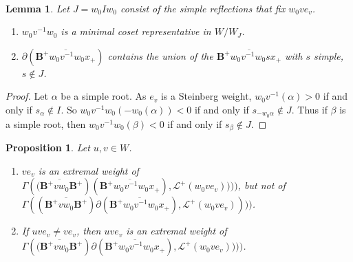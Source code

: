 \documentclass[sn-mathphys-num]{sn-jnl}%
\newcommand{\Ll}{\mathcal L}
\newcommand{\fb}{\mathbf B}
\newtheorem{lemma}[theorem]{Lemma}
\newtheorem{proposition}[theorem]{Proposition}
\theoremstyle{definition}
\begin{document}
\

\begin{lemma}
\label{lem:s to boundary}Let $J=w_0Iw_0$ consist of the simple reflections that fix $w_0ve_v$. 
\begin{enumerate}
\item $w_0v^{-1}w_0$  is a minimal coset representative in $W/W_J$.
\item $\partial(\overline{{\fb}^+w_0v^{-1}w_0x_+})$ contains the union of the 
$\overline{{\fb}^+w_0v^{-1}w_0sx_+}$ with $s$ simple, $s\notin J$.
\end{enumerate}
\end{lemma}
\begin{proof}Let  $\alpha$ be a simple root.
As $e_v$ is a Steinberg weight, $w_0v^{-1}(\alpha)>0$ if and only if $s_\alpha\notin I$.
So $w_0v^{-1}w_0(-w_0(\alpha))<0$ if and only if $s_{-w_0\alpha}\notin J$.
Thus if $\beta$ is a simple root, then $w_0v^{-1}w_0(\beta)<0$ if and only if $s_{\beta}\notin J$.
\end{proof}
\begin{proposition}\label{prop:extremal2}
 Let $u,v\in W$.
 \begin{enumerate}
 \item $ve_v$ is an extremal weight of $\Gamma(\overline{({\fb}^+vw_0{\fb}^+})(\overline{{\fb}^+w_0v^{-1}w_0x_+}),\Ll^+(w_0ve_v))))$, but not of 
$\Gamma((\overline{{\fb}^+vw_0\fb^+})
\partial(\overline{{\fb}^+w_0v^{-1}w_0x_+}),\Ll^+(w_0ve_v))))$.
 \item If $uve_v\neq ve_v$, then $uve_v$ is an extremal weight of $\Gamma(\overline{({\fb}^+vw_0\fb^+})
\partial(\overline{{\fb}^+w_0v^{-1}w_0x_+}),\Ll^+(w_0ve_v))))$.
 \end{enumerate}
 \end{proposition}
\end{document}
